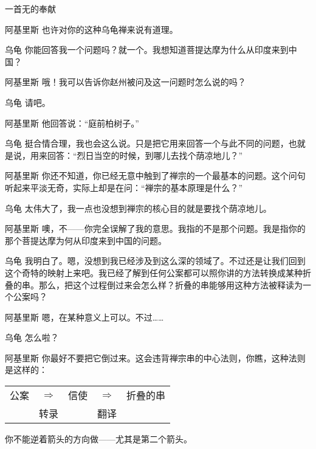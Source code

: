 \begin{dialog}{一首无的奉献\label{abcd}}
\begin{dialogue}
\item[阿基里斯]也许对你的这种乌龟禅来说有道理。

\item[乌龟]你能回答我一个问题吗？就一个。我想知道菩提达摩为什么从印度来到中国？

\item[阿基里斯]哦！我可以告诉你赵州被问及这一问题时怎么说的吗？

\item[乌龟]请吧。

\item[阿基里斯]他回答说：“庭前柏树子。”

\item[乌龟]挺合情合理，我也会这么说。只是把它用来回答一个与此不同的问题，也就是说，用来回答：“烈日当空的时候，到哪儿去找个荫凉地儿？”

\item[阿基里斯]你还不知道，你已经无意中触到了禅宗的一个最基本的问题。这个问句听起来平淡无奇，实际上却是在问：“禅宗的基本原理是什么？”

\item[乌龟]太伟大了，我一点也没想到禅宗的核心目的就是要找个荫凉地儿。

\item[阿基里斯]噢，不——你完全误解了我的意思。我指的不是那个问题。我是指你的那个菩提达摩为何从印度来到中国的问题。

\item[乌龟]我明白了。嗯，没想到我已经涉及到这么深的领域了。不过还是让我们回到这个奇特的映射上来吧。我已经了解到任何公案都可以照你讲的方法转换成某种折叠的串。那么，把这个过程倒过来会怎么样？折叠的串能够用这种方法被释读为一个公案吗？

\item[阿基里斯]嗯，在某种意义上可以。不过……

\item[乌龟]怎么啦？

\item[阿基里斯]你最好不要把它倒过来。这会违背禅宗串的中心法则，你瞧，这种法则是这样的：
    \begin{center}
    \begin{tabular}{ccccc}
     公案  & $\Longrightarrow$ & 信使 & $\Longrightarrow$ & 折叠的串 \\
         & 转录                                 &     & 翻译
    \end{tabular}
    \end{center}
你不能逆着箭头的方向做——尤其是第二个箭头。


\end{dialogue}
\end{dialog}
